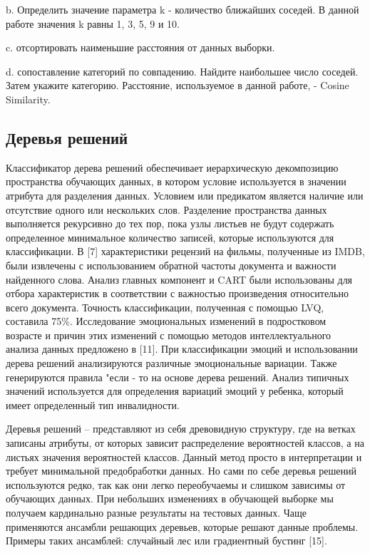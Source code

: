b. Определить значение параметра k - количество ближайших соседей. В данной
работе значения k равны 1, 3, 5, 9 и 10. 

c. отсортировать наименьшие расстояния от данных выборки.

d. сопоставление категорий по совпадению. Найдите наибольшее число соседей.
Затем укажите категорию.  Расстояние, используемое в данной работе, - Cosine
Similarity.

\subsection{Деревья решений}

Классификатор дерева решений обеспечивает иерархическую декомпозицию
пространства обучающих данных, в котором условие используется в значении
атрибута для разделения данных. Условием или предикатом является наличие или
отсутствие одного или нескольких слов. Разделение пространства данных
выполняется рекурсивно до тех пор, пока узлы листьев не будут содержать
определенное минимальное количество записей, которые используются для
классификации. В [7] характеристики рецензий на фильмы, полученные из IMDB,
были извлечены с использованием обратной частоты документа и важности найденного
слова. Анализ главных компонент и CART были использованы для отбора
характеристик в соответствии с важностью произведения относительно всего
документа. Точность классификации, полученная с помощью LVQ, составила 75\%.
Исследование эмоциональных изменений в подростковом возрасте и причин этих
изменений с помощью методов интеллектуального анализа данных предложено в [11].
При классификации эмоций и использовании дерева решений анализируются различные
эмоциональные вариации. Также генерируются правила "если - то на основе дерева
решений. Анализ типичных значений используется для определения вариаций эмоций у
ребенка, который имеет определенный тип инвалидности. \cite{article4}

Деревья решений – представляют из себя древовидную структуру, где на ветках
записаны атрибуты, от которых зависит распределение вероятностей классов, а на
листьях значения вероятностей классов. Данный метод просто в интерпретации и
требует минимальной предобработки данных. Но сами по себе деревья решений
используются редко, так как они легко переобучаемы и слишком зависимы от
обучающих данных. При небольших изменениях в обучающей выборке мы получаем
кардинально разные результаты на тестовых данных. Чаще применяются ансамбли
решающих деревьев, которые решают данные проблемы. Примеры таких ансамблей:
случайный лес или градиентный бустинг [15]. \cite{article9}

